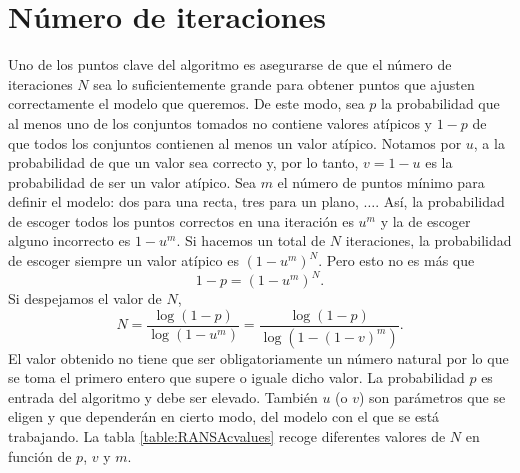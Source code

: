 \section{Número de iteraciones}
Uno de los puntos clave del algoritmo es asegurarse de que el número de iteraciones $ N $ sea lo suficientemente grande para obtener puntos que ajusten correctamente el modelo que queremos. De este modo, sea $ p $ la probabilidad que al menos uno de los conjuntos tomados no contiene valores atípicos y $ 1-p $ de que todos los conjuntos contienen al menos un valor atípico. Notamos por $ u $, a la probabilidad de que un valor sea correcto y, por lo tanto, $ v = 1 - u $ es la probabilidad de ser un valor atípico. Sea $ m $ el número de puntos mínimo para definir el modelo: dos para una recta, tres para un plano, $ \dots $. Así, la probabilidad de escoger todos los puntos correctos en una iteración es $ u^m $ y la de escoger alguno incorrecto es $ 1-u^m $. Si hacemos un total de $ N $ iteraciones, la probabilidad de escoger siempre un valor atípico es $ (1-u^m)^N $. Pero esto no es más que
\[
1-p = (1-u^m)^N.
\]
Si despejamos el valor de $ N $,
\begin{equation}
N = \frac{\log(1-p)}{\log(1-u^m)} = \frac{\log(1-p)}{\log(1-(1-v)^m)}.
\end{equation}
El valor obtenido no tiene que ser obligatoriamente un número natural por lo que se toma el primero entero que supere o iguale dicho valor. La probabilidad $ p $ es entrada del algoritmo y debe ser elevado. También $ u $ (o $ v $) son parámetros que se eligen y que dependerán en cierto modo, del modelo con el que se está trabajando. La tabla \ref{table:RANSAcvalues} recoge diferentes valores de $ N $ en función de $ p $, $ v $ y $ m $.
